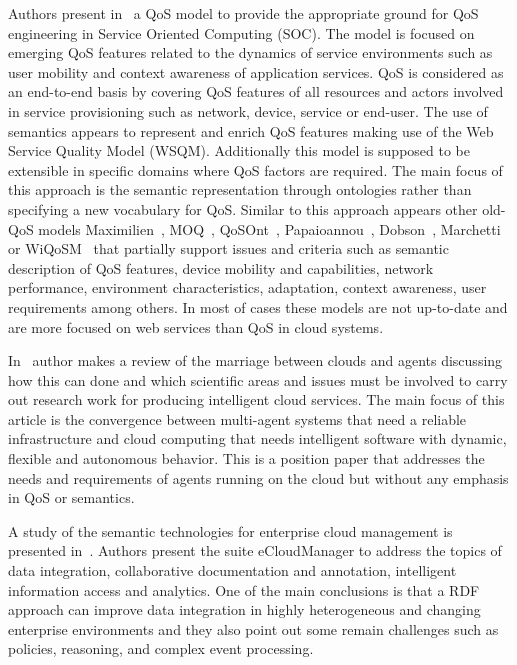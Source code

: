 Authors present in~\cite{Mabrouk:2009:SEQ:1564601.1564724} a QoS model to provide the appropriate ground for QoS 
engineering in Service Oriented Computing (SOC). The model is focused on 
emerging QoS features related to the dynamics of service environments such as 
user mobility and context awareness of application services. QoS is considered 
as an end-to-end basis by covering QoS features of all resources and actors 
involved in service provisioning such as network, device, service or end-user. 
The use of semantics appears to represent and enrich QoS features making use of 
the Web Service Quality Model (WSQM). Additionally this model is supposed to be 
extensible in specific domains where QoS factors are required. The main focus of 
this approach is the semantic representation through ontologies rather than 
specifying a new vocabulary for QoS. Similar to this approach appears other 
old-QoS models Maximilien~\cite{Maximilien:2004:FOD:1024866.1025003}, MOQ~\cite{Kim:2007:MWS:1359823.1359827}, 
QoSOnt~\cite{Dobson:2005:QQO:1090946.1091252}, Papaioannou~\cite{Papaioannou:2006:QOL:1129027.1129054}, Dobson~\cite{Dobson:2006:TUQ:1173701.1174285}, 
Marchetti~\cite{Marchetti:2004:QMM:1013367.1013377} or WiQoSM~\cite{Resta:2008:WIQ:1340085.1340215} that partially support issues and criteria 
such as semantic description of QoS features, device mobility and capabilities, 
network performance,  environment characteristics, adaptation, context 
awareness, user requirements among others. In most of cases these models are not 
up-to-date and are more focused on web services than QoS in cloud systems.


In~\cite{DBLP:conf/woa/Talia11} author makes a review of the marriage between clouds and agents 
discussing how this can done and which scientific areas and issues must be 
involved to carry out research work for producing intelligent cloud services. 
The main focus of this article is the convergence between multi-agent systems 
that need a reliable infrastructure and cloud computing that needs intelligent 
software with dynamic, flexible and autonomous behavior. This is a position 
paper that addresses the needs and requirements of agents running on the cloud 
but without any emphasis in QoS or semantics.


A study of the semantic technologies for enterprise cloud management is presented in~\cite{Haase:2010:STE:1940334.1940342}. Authors present the suite eCloudManager to address 
the topics of data integration, collaborative documentation and annotation, intelligent information access and analytics. One of the main conclusions is that a RDF approach can 
improve data integration in highly heterogeneous and changing enterprise environments and they also point out some remain challenges such as policies, reasoning, and complex event processing.


